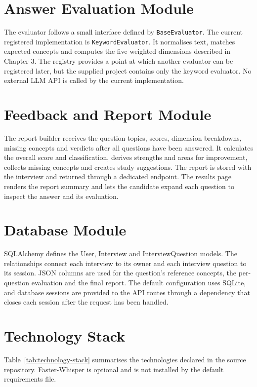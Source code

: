 \documentclass[12pt,a4paper,oneside]{report}
\begin{document}
\section{Answer Evaluation Module}
The evaluator follows a small interface defined by \texttt{BaseEvaluator}. The current registered implementation is \texttt{KeywordEvaluator}. It normalises text, matches expected concepts and computes the five weighted dimensions described in Chapter 3. The registry provides a point at which another evaluator can be registered later, but the supplied project contains only the keyword evaluator. No external LLM API is called by the current implementation.

\section{Feedback and Report Module}
The report builder receives the question topics, scores, dimension breakdowns, missing concepts and verdicts after all questions have been answered. It calculates the overall score and classification, derives strengths and areas for improvement, collects missing concepts and creates study suggestions. The report is stored with the interview and returned through a dedicated endpoint. The results page renders the report summary and lets the candidate expand each question to inspect the answer and its evaluation.

\section{Database Module}
SQLAlchemy defines the User, Interview and InterviewQuestion models. The relationships connect each interview to its owner and each interview question to its session. JSON columns are used for the question's reference concepts, the per-question evaluation and the final report. The default configuration uses SQLite, and database sessions are provided to the API routes through a dependency that closes each session after the request has been handled.

\section{Technology Stack}
Table~\ref{tab:technology-stack} summarises the technologies declared in the source repository. Faster-Whisper is optional and is not installed by the default requirements file.
\end{document}
